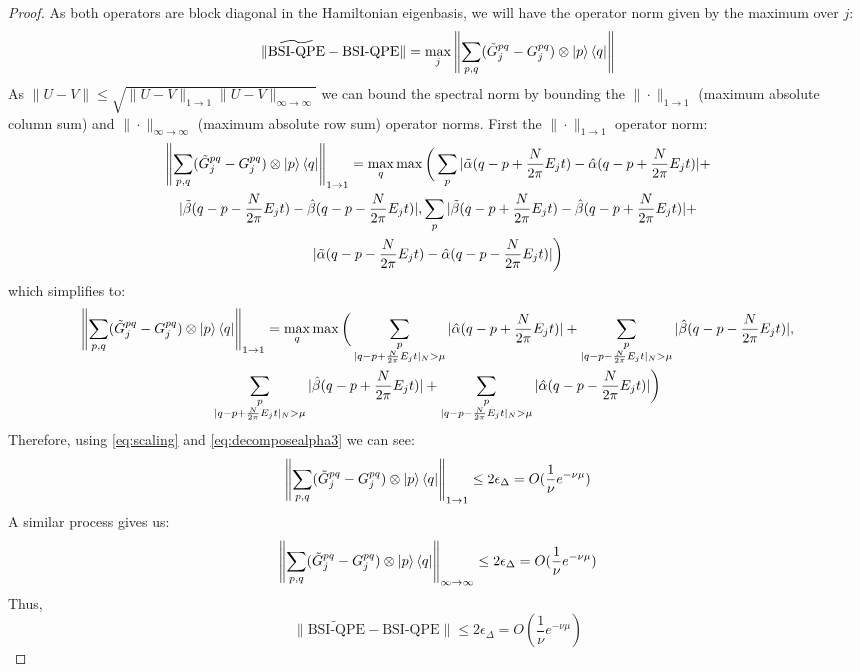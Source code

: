 \begin{proof}
    As both operators are block diagonal in the Hamiltonian eigenbasis, we will have the operator norm given by the maximum over $j$:
    \begin{equation}
        \|\widetilde{\text{BSI-QPE}}-\text{BSI-QPE}\| = \max_j 
        \left\|\sum_{p,q}(\tilde G^{pq}_j - G^{pq}_j) \otimes \ket{p}\bra{q}\right\|
    \end{equation}
    As $\|U-V\| \leq \sqrt{\|U-V\|_{1\to1}\|U-V\|_{\infty\to\infty}}$ we can bound the spectral norm by bounding the $\|\cdot\|_{1\to1}$ (maximum absolute column sum) and $\|\cdot\|_{\infty\to\infty}$ (maximum absolute row sum) operator norms. First the $\|\cdot\|_{1\to1}$  operator norm:
    \begin{multline}
         \left\|\sum_{p,q}(\tilde G^{pq}_j - G^{pq}_j) \otimes \ket{p}\bra{q}\right\|_{1\to1} = \max_q \max\bigg(\sum_{p}|\tilde\alpha(q-p+\frac{N}{2\pi}E_jt)-\hat\alpha(q-p+\frac{N}{2\pi}E_jt)|+\\|\tilde\beta (q-p-\frac{N}{2\pi}E_jt)-\hat\beta (q-p-\frac{N}{2\pi}E_jt)|, \sum_{p}|\tilde\beta(q-p+\frac{N}{2\pi}E_jt)-\hat\beta(q-p+\frac{N}{2\pi}E_jt)|+\\|\tilde\alpha (q-p-\frac{N}{2\pi}E_jt)-\hat\alpha (q-p-\frac{N}{2\pi}E_jt)|\bigg)
    \end{multline}
    which simplifies to:
    \begin{multline}
         \left\|\sum_{p,q}(\tilde G^{pq}_j - G^{pq}_j) \otimes \ket{p}\bra{q}\right\|_{1\to1} = \max_q\max\bigg(\sum_{\substack{p\\|q-p+\frac{N}{2\pi}E_jt|_{N}>\mu}}|\hat\alpha(q-p+\frac{N}{2\pi}E_jt)|+\sum_{\substack{p\\|q-p-\frac{N}{2\pi}E_jt|_{N}>\mu}}|\hat\beta (q-p-\frac{N}{2\pi}E_jt)|,\\
         \sum_{\substack{p\\|q-p+\frac{N}{2\pi}E_jt|_{N}>\mu}}|\hat\beta(q-p+\frac{N}{2\pi}E_jt)|+\sum_{\substack{p\\|q-p-\frac{N}{2\pi}E_jt|_{N}>\mu}}|\hat\alpha (q-p-\frac{N}{2\pi}E_jt)|\bigg)
    \end{multline}
    Therefore, using \eqref{eq:scaling} and \eqref{eq:decomposealpha3}  we can see:
    \begin{equation}
        \left\|\sum_{p,q}(\tilde G^{pq}_j - G^{pq}_j) \otimes \ket{p}\bra{q}\right\|_{1\to1} \leq 2\epsilon_{\Delta} = O(\frac{1}{\nu}e^{-\nu \mu})
    \end{equation}
    A similar process gives us:
    \begin{equation}
        \left\|\sum_{p,q}(\tilde G^{pq}_j - G^{pq}_j) \otimes \ket{p}\bra{q}\right\|_{\infty\to\infty} \leq 2\epsilon_{\Delta} =O(\frac{1}{\nu}e^{-\nu \mu})
    \end{equation}
    Thus,
    \begin{equation}
        \|\widetilde{\text{BSI-QPE}}-\text{BSI-QPE}\| \leq 2\epsilon_{\Delta} = O\left(\frac{1}{\nu}e^{-\nu \mu}\right)
    \end{equation}
\end{proof}
